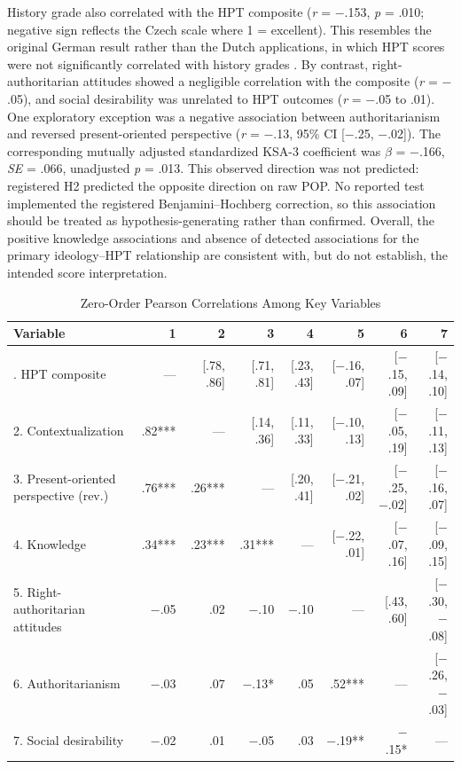 \documentclass[PCJ,Unicode,screen,mode=plain]{cedram}
\begin{document}
History grade also correlated with the HPT composite (\emph{r} = $-$.153, \emph{p} = .010; negative sign reflects the Czech scale where 1 = excellent). This resembles the original German result rather than the Dutch applications, in which HPT scores were not significantly correlated with history grades \citep{Huijgen_et_al2014Testing,Huijgen_et_al2017Toward}. By contrast, right-authoritarian attitudes showed a negligible correlation with the composite (\emph{r} = $-$.05), and social desirability was unrelated to HPT outcomes (\emph{r} = $-$.05 to .01). One exploratory exception was a negative association between authoritarianism and reversed present-oriented perspective (\emph{r} = $-$.13, 95\% CI [$-$.25, $-$.02]). The corresponding mutually adjusted standardized KSA-3 coefficient was \(\beta\) = $-$.166, \emph{SE} = .066, unadjusted \emph{p} = .013. This observed direction was not predicted: registered H2 predicted the opposite direction on raw POP. No reported test implemented the registered Benjamini--Hochberg correction, so this association should be treated as hypothesis-generating rather than confirmed. Overall, the positive knowledge associations and absence of detected associations for the primary ideology--HPT relationship are consistent with, but do not establish, the intended score interpretation.

\begin{scriptsize}
\begin{longtable}[]{@{}lrrrrrrr@{}}
\caption{Zero-Order Pearson Correlations Among Key Variables}\label{tab:5}\\
\toprule
Variable & 1 & 2 & 3 & 4 & 5 & 6 & 7 \\
\midrule
\endhead
\bottomrule
\endlastfoot
1. HPT composite & --- & [.78, .86] & [.71, .81] & [.23, .43] & [$-$.16, .07] & [$-$.15, .09] & [$-$.14, .10] \\
2. Contextualization & .82*** & --- & [.14, .36] & [.11, .33] & [$-$.10, .13] & [$-$.05, .19] & [$-$.11, .13] \\
3. Present-oriented perspective (rev.) & .76*** & .26*** & --- & [.20, .41] & [$-$.21, .02] & [$-$.25, $-$.02] & [$-$.16, .07] \\
4. Knowledge & .34*** & .23*** & .31*** & --- & [$-$.22, .01] & [$-$.07, .16] & [$-$.09, .15] \\
5. Right-authoritarian attitudes & $-$.05 & .02 & $-$.10 & $-$.10 & --- & [.43, .60] & [$-$.30, $-$.08] \\
6. Authoritarianism & $-$.03 & .07 & $-$.13* & .05 & .52*** & --- & [$-$.26, $-$.03] \\
7. Social desirability & $-$.02 & .01 & $-$.05 & .03 & $-$.19** & $-$.15* & --- \\
\end{longtable}
\end{scriptsize}
\end{document}
